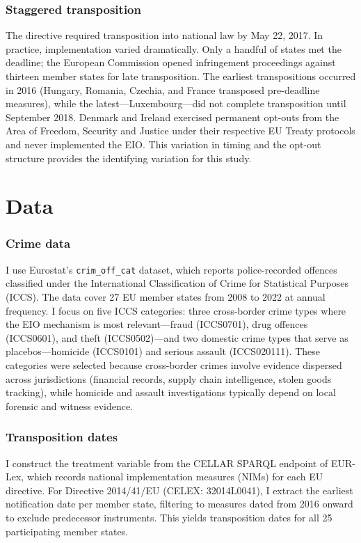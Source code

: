\documentclass[12pt]{article}
\begin{document}
\subsubsection*{Staggered transposition}  The directive required transposition into national law by May 22, 2017. In practice, implementation varied dramatically. Only a handful of states met the deadline; the European Commission opened infringement proceedings against thirteen member states for late transposition. The earliest transpositions occurred in 2016 (Hungary, Romania, Czechia, and France transposed pre-deadline measures), while the latest---Luxembourg---did not complete transposition until September 2018. Denmark and Ireland exercised permanent opt-outs from the Area of Freedom, Security and Justice under their respective EU Treaty protocols and never implemented the EIO. This variation in timing and the opt-out structure provides the identifying variation for this study.


\section{Data}

\subsubsection*{Crime data}  I use Eurostat's \texttt{crim\_off\_cat} dataset, which reports police-recorded offences classified under the International Classification of Crime for Statistical Purposes (ICCS). The data cover 27 EU member states from 2008 to 2022 at annual frequency. I focus on five ICCS categories: three cross-border crime types where the EIO mechanism is most relevant---fraud (ICCS0701), drug offences (ICCS0601), and theft (ICCS0502)---and two domestic crime types that serve as placebos---homicide (ICCS0101) and serious assault (ICCS020111). These categories were selected because cross-border crimes involve evidence dispersed across jurisdictions (financial records, supply chain intelligence, stolen goods tracking), while homicide and assault investigations typically depend on local forensic and witness evidence.

\subsubsection*{Transposition dates}  I construct the treatment variable from the CELLAR SPARQL endpoint of EUR-Lex, which records national implementation measures (NIMs) for each EU directive. For Directive 2014/41/EU (CELEX: 32014L0041), I extract the earliest notification date per member state, filtering to measures dated from 2016 onward to exclude predecessor instruments. This yields transposition dates for all 25 participating member states.
\end{document}
